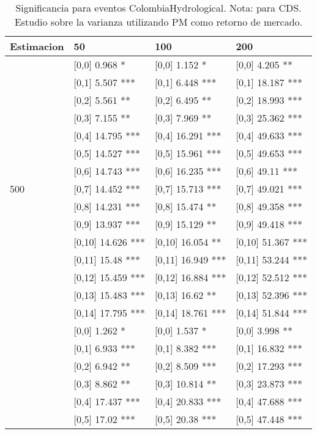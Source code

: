\begin{table}

\caption{Significancia para eventos ColombiaHydrological. Nota: para CDS. Estudio sobre la varianza utilizando PM como retorno de mercado.}
\centering
\begin{tabular}[t]{llll}
\toprule
Estimacion & 50 & 100 & 200\\
\midrule
 & {}[0,0] 0.968 * & {}[0,0] 1.152 * & {}[0,0] 4.205 **\\
 & {}[0,1] 5.507 *** & {}[0,1] 6.448 *** & {}[0,1] 18.187 ***\\
 & {}[0,2] 5.561 ** & {}[0,2] 6.495 ** & {}[0,2] 18.993 ***\\
 & {}[0,3] 7.155 ** & {}[0,3] 7.969 ** & {}[0,3] 25.362 ***\\
 & {}[0,4] 14.795 *** & {}[0,4] 16.291 *** & {}[0,4] 49.633 ***\\
\addlinespace
 & {}[0,5] 14.527 *** & {}[0,5] 15.961 *** & {}[0,5] 49.653 ***\\
 & {}[0,6] 14.743 *** & {}[0,6] 16.235 *** & {}[0,6] 49.11 ***\\
500 & {}[0,7] 14.452 *** & {}[0,7] 15.713 *** & {}[0,7] 49.021 ***\\
 & {}[0,8] 14.231 *** & {}[0,8] 15.474 ** & {}[0,8] 49.358 ***\\
 & {}[0,9] 13.937 *** & {}[0,9] 15.129 ** & {}[0,9] 49.418 ***\\
\addlinespace
 & {}[0,10] 14.626 *** & {}[0,10] 16.054 ** & {}[0,10] 51.367 ***\\
 & {}[0,11] 15.48 *** & {}[0,11] 16.949 *** & {}[0,11] 53.244 ***\\
 & {}[0,12] 15.459 *** & {}[0,12] 16.884 *** & {}[0,12] 52.512 ***\\
 & {}[0,13] 15.483 *** & {}[0,13] 16.62 ** & {}[0,13] 52.396 ***\\
 & {}[0,14] 17.795 *** & {}[0,14] 18.761 *** & {}[0,14] 51.844 ***\\
\addlinespace
 & {}[0,0] 1.262 * & {}[0,0] 1.537 * & {}[0,0] 3.998 **\\
 & {}[0,1] 6.933 *** & {}[0,1] 8.382 *** & {}[0,1] 16.832 ***\\
 & {}[0,2] 6.942 ** & {}[0,2] 8.509 *** & {}[0,2] 17.293 ***\\
 & {}[0,3] 8.862 ** & {}[0,3] 10.814 ** & {}[0,3] 23.873 ***\\
 & {}[0,4] 17.437 *** & {}[0,4] 20.833 *** & {}[0,4] 47.688 ***\\
\addlinespace
 & {}[0,5] 17.02 *** & {}[0,5] 20.38 *** & {}[0,5] 47.448 ***\\

\end{tabular}
\end{table}
